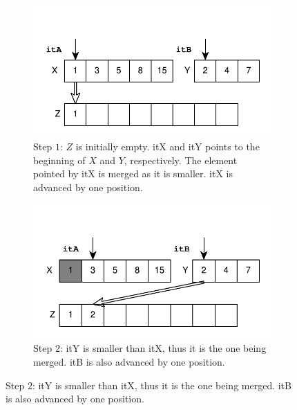 \begin{figure}
	\centering
	\begin{subfigure}[b]{0.45\textwidth}
		\centering
		\includegraphics[trim=0 0 0 45,clip,width=\textwidth]{sources/median_sorted_arrays/images/mergearrays0}
		\caption{Step $1$: $Z$ is initially empty. itX and itY points to the beginning of $X$ and $Y$, respectively. The element pointed by itX is merged as it is smaller. itX is advanced by one position.}
		\label{fig:median_sorted_array:mergearray0}
	\end{subfigure}
	\hfill
	\begin{subfigure}[b]{0.45\textwidth}
		\centering
		\includegraphics[trim=0 0 0 45,clip,width=\textwidth]{sources/median_sorted_arrays/images/mergearrays1}
		\caption{Step $2$: itY is smaller than itX, thus it is the one being merged. itB is also advanced by one position. }
		\label{fig:median_sorted_array:mergearray1}
	\end{subfigure}
	\hfill


\end{figure}
